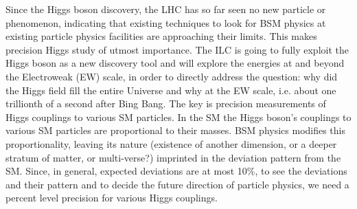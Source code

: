 Since the Higgs boson discovery, the LHC has so far seen no new particle or phenomenon, indicating that existing techniques to look for BSM physics at existing particle physics facilities are approaching their limits. This makes precision Higgs study of utmost importance. The ILC is going to fully exploit the Higgs boson as a new discovery tool and will explore the energies at and beyond the Electroweak (EW) scale, in order to directly address the question: why did the Higgs field fill the entire Universe and why at the EW scale, i.e. about one trillionth of a second after Bing Bang. 
The key is precision measurements of Higgs couplings to various SM particles. In the SM the Higgs boson's couplings to various SM particles are proportional to their masses. BSM physics modifies this proportionality, leaving its nature (existence of another dimension, or a deeper stratum of matter, or multi-verse?) imprinted in the deviation pattern from the SM. 
Since, in general, expected deviations are at most 10\%, to see the deviations and their pattern and to decide the future direction of particle physics, we need a percent level precision for various Higgs couplings.

